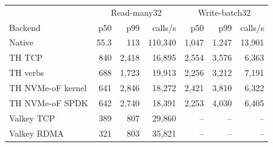 \small
\begin{tabular}{lrrr|rrr}\toprule
& \multicolumn{3}{c|}{Read-many32} & \multicolumn{3}{c}{Write-batch32}\\
Backend & p50 & p99 & calls/s & p50 & p99 & calls/s\\\midrule
Native & 55.3 & 113 & 110{,}340 & 1{,}047 & 1{,}247 & 13{,}901\\
TH TCP & 840 & 2{,}418 & 16{,}895 & 2{,}554 & 3{,}576 & 6{,}363\\
TH verbs & 688 & 1{,}723 & 19{,}913 & 2{,}256 & 3{,}212 & 7{,}191\\
TH NVMe-oF kernel & 641 & 2{,}846 & 18{,}272 & 2{,}421 & 3{,}810 & 6{,}322\\
TH NVMe-oF SPDK & 642 & 2{,}740 & 18{,}391 & 2{,}253 & 4{,}030 & 6{,}405\\
Valkey TCP & 389 & 807 & 29{,}860 & -- & -- & --\\
Valkey RDMA & 321 & 803 & 35{,}821 & -- & -- & --\\
\bottomrule\end{tabular}
